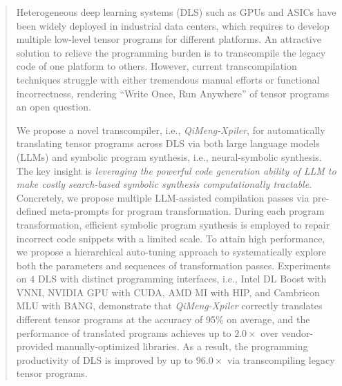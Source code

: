 \begin{abstract}
Heterogeneous deep learning systems (DLS) such as GPUs and ASICs have been widely deployed in industrial data centers, which requires to develop multiple low-level tensor programs for different platforms. An attractive solution to relieve the programming burden is to transcompile the legacy code of one platform to others. However, current transcompilation techniques struggle with either tremendous manual efforts or functional incorrectness, rendering “Write Once, Run Anywhere” of tensor programs an open question.

We propose a novel transcompiler, i.e., \textit{QiMeng-Xpiler}, for automatically translating tensor programs across DLS via both large language models (LLMs) and symbolic program synthesis, i.e., neural-symbolic synthesis. 
The key insight is \emph{leveraging the powerful code generation ability of LLM to make costly search-based symbolic synthesis computationally tractable}. Concretely, we propose multiple LLM-assisted compilation passes via pre-defined meta-prompts for program transformation. During each program transformation, efficient symbolic program synthesis is employed to repair incorrect code snippets with a limited scale. To attain high performance, we propose a hierarchical auto-tuning approach to systematically explore both the parameters and sequences of transformation passes.
Experiments on $4$ DLS with distinct programming interfaces, i.e., Intel DL Boost with VNNI, NVIDIA GPU with CUDA, AMD MI with HIP, and Cambricon MLU with BANG, demonstrate that \textit{QiMeng-Xpiler} correctly translates different tensor programs at the accuracy of 95\% on average, and the performance of translated programs achieves up to $2.0\times$ over vendor-provided manually-optimized libraries. As a result, the programming productivity of DLS is improved by up to $96.0\times$ via transcompiling legacy tensor programs.


\end{abstract}










